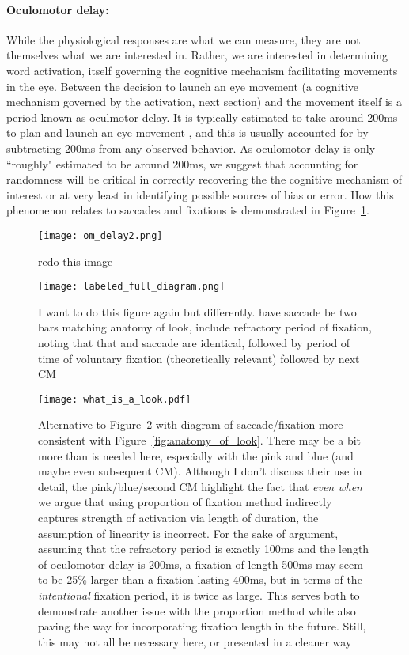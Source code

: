 \paragraph{Oculomotor delay:} While the physiological responses are what we can measure, they are not themselves what we are interested in. Rather, we are interested in determining word activation, itself governing the cognitive mechanism facilitating movements in the eye. Between the decision to launch an eye movement (a cognitive mechanism governed by the activation, next section) and the movement itself is a period known as oculmotor delay. It is typically estimated to take around 200ms to plan and launch an eye movement \cite{viviani1990time}, and this is usually accounted for by subtracting 200ms from any observed behavior. As oculomotor delay is only ``roughly" estimated to be around 200ms, we suggest that accounting for randomness will be critical in correctly recovering the the cognitive mechanism of interest or at very least in identifying possible sources of bias or error. How this phenomenon relates to saccades and fixations is demonstrated in Figure~\ref{fig:sac_fix_look_om}.


\begin{figure}[H]
\centering
\texttt{[image: om\_delay2.png]}
\caption{redo this image}
\label{fig:sac_fix_look_om}
\end{figure}


\begin{figure}
\centering
\texttt{[image: labeled\_full\_diagram.png]}
\caption{I want to do this figure again but differently. have saccade be  two bars matching anatomy of look, include refractory period of fixation, noting that that and saccade are identical, followed by period of time of voluntary fixation (theoretically relevant) followed by next CM}
\label{fig:full_diagram_looks}
\end{figure}

\begin{figure}
\centering
\texttt{[image: what\_is\_a\_look.pdf]}
\label{fig:whats_in_a_look}
\caption{Alternative to Figure~\ref{fig:full_diagram_looks} with diagram of saccade/fixation more consistent with Figure~\ref{fig:anatomy_of_look}. There may be a bit more than is needed here, especially with the pink and blue (and maybe even subsequent CM). Although I don't discuss their use in detail, the pink/blue/second CM highlight the fact that \textit{even when} we argue that using proportion of fixation method indirectly captures strength of activation via length of duration, the assumption of linearity is incorrect. For the sake of argument, assuming that the refractory period is exactly 100ms and the length of oculomotor delay is 200ms, a fixation of length 500ms may seem to be 25\% larger than a fixation lasting 400ms, but in terms of the \textit{intentional} fixation period, it is twice as large. This serves both to demonstrate another issue with the proportion method while also paving the way for incorporating fixation length in the future. Still, this may not all be necessary here, or presented in a cleaner way} 
\end{figure}

